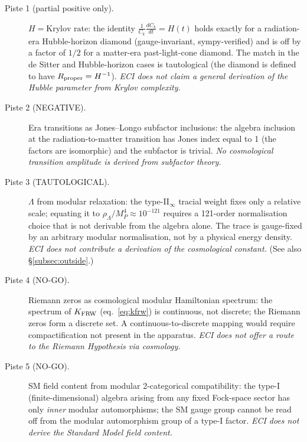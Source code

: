 \begin{description}

\item[Piste 1 (partial positive only).]
  $H = \text{Krylov rate}$: the identity
  $\tfrac{1}{C_k}\tfrac{dC_k}{dt} = H(t)$ holds exactly for a
  radiation-era Hubble-horizon diamond (gauge-invariant, sympy-verified) and
  is off by a factor of $1/2$ for a matter-era past-light-cone diamond.
  The match in the de Sitter and Hubble-horizon cases is tautological
  (the diamond is defined to have $R_{\rm proper} = H^{-1}$).
  \emph{ECI does not claim a general derivation of the Hubble parameter
  from Krylov complexity.}

\item[Piste 2 (NEGATIVE).]
  Era transitions as Jones--Longo subfactor inclusions: the algebra
  inclusion at the radiation-to-matter transition has Jones index equal to 1
  (the factors are isomorphic) and the subfactor is trivial.
  \emph{No cosmological transition amplitude is derived from subfactor theory.}

\item[Piste 3 (TAUTOLOGICAL).]
  $\Lambda$ from modular relaxation: the type-II$_\infty$ tracial weight
  fixes only a relative scale; equating it to $\rho_\Lambda / M_P^4 \approx
  10^{-121}$ requires a 121-order normalisation choice that is not derivable
  from the algebra alone.  The trace is gauge-fixed by an arbitrary modular
  normalisation, not by a physical energy density.
  \emph{ECI does not contribute a derivation of the cosmological constant.}
  (See also \S\ref{subsec:outside}.)

\item[Piste 4 (NO-GO).]
  Riemann zeros as cosmological modular Hamiltonian spectrum: the spectrum
  of $K_{\rm FRW}$ (eq.~\eqref{eq:kfrw}) is continuous, not discrete;
  the Riemann zeros form a discrete set.  A continuous-to-discrete
  mapping would require compactification not present in the apparatus.
  \emph{ECI does not offer a route to the Riemann Hypothesis via cosmology.}

\item[Piste 5 (NO-GO).]
  SM field content from modular 2-categorical compatibility: the
  type-I (finite-dimensional) algebra arising from any fixed Fock-space
  sector has only \emph{inner} modular automorphisms; the SM gauge group
  cannot be read off from the modular automorphism group of a type-I factor.
  \emph{ECI does not derive the Standard Model field content.}

\end{description}

